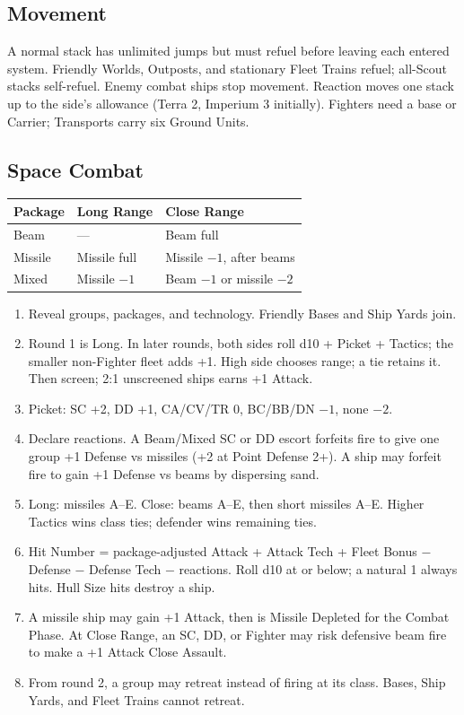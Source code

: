 \subsection{Movement}

A normal stack has unlimited jumps but must refuel before leaving each entered
system. Friendly Worlds, Outposts, and stationary Fleet Trains refuel; all-Scout
stacks self-refuel. Enemy combat ships stop movement. Reaction moves one stack
up to the side's allowance (Terra 2, Imperium 3 initially). Fighters need a
base or Carrier; Transports carry six Ground Units.

\subsection{Space Combat}

\begin{tabularx}{\columnwidth}{@{}lXX@{}}
\toprule
Package & Long Range & Close Range \\
\midrule
Beam & --- & Beam full \\
Missile & Missile full & Missile $-1$, after beams \\
Mixed & Missile $-1$ & Beam $-1$ or missile $-2$ \\
\bottomrule
\end{tabularx}

\begin{enumerate}
  \item Reveal groups, packages, and technology. Friendly Bases and Ship Yards
    join.
  \item Round 1 is Long. In later rounds, both sides roll d10 + Picket +
    Tactics; the smaller non-Fighter fleet adds +1. High side chooses range; a
    tie retains it. Then screen; 2:1 unscreened ships earns +1 Attack.
  \item Picket: SC +2, DD +1, CA/CV/TR 0, BC/BB/DN $-1$, none $-2$.
  \item Declare reactions. A Beam/Mixed SC or DD escort forfeits fire to give
    one group +1 Defense vs missiles (+2 at Point Defense 2+). A ship may
    forfeit fire to gain +1 Defense vs beams by dispersing sand.
  \item Long: missiles A--E. Close: beams A--E, then short missiles A--E.
    Higher Tactics wins class ties; defender wins remaining ties.
  \item Hit Number = package-adjusted Attack + Attack Tech + Fleet Bonus
    $-$ Defense $-$ Defense Tech $-$ reactions. Roll d10 at or below; a
    natural 1 always hits. Hull Size hits destroy a ship.
  \item A missile ship may gain +1 Attack, then is Missile Depleted for the
    Combat Phase. At Close Range, an SC, DD, or Fighter may risk defensive
    beam fire to make a +1 Attack Close Assault.
  \item From round 2, a group may retreat instead of firing at its class.
    Bases, Ship Yards, and Fleet Trains cannot retreat.
\end{enumerate}


